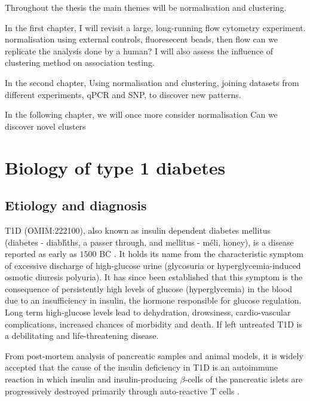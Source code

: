Throughout the thesis the main themes will be normalisation and clustering.

In the first chapter, I will revisit a large, long-running flow cytometry experiment.
normalisation using external controls, fluoresecent beads, then
flow can we replicate the analysis done by a human?
I will also assess the influence of clustering method on association testing.

In the second chapter,
Using normalisation and clustering, joining datasets from different experiments, qPCR and SNP, to discover new patterns.

In the following chapter,
we will once more consider normalisation 
Can we discover novel clusters



\section{Biology of type 1 diabetes}

\subsection{Etiology and diagnosis}

\Gls{T1D} (OMIM:222100), also known as insulin dependent diabetes mellitus (diabetes - \foreignlanguage{greek}{diab\'hths},
a passer through, and mellitus - \foreignlanguage{greek}{m\'eli}, honey), is a disease reported as early as $1500$ BC \citep{Poretsky:2010wr}.
It holds its name from the characteristic symptom of excessive discharge of high-glucose urine (glycosuria or hyperglycemia-induced osmotic diuresis polyuria).
It has since been established that this symptom is the consequence of persistently high levels of glucose (hyperglycemia) in the blood due to an insufficiency in insulin,
the hormone responsible for glucose regulation.
Long term high-glucose levels lead to dehydration, drowsiness, cardio-vascular complications, increased chances of morbidity and death.  
If left untreated T1D is a debilitating and life-threatening disease.

From post-mortem analysis of pancreatic samples and animal models,
it is widely accepted that the cause of the insulin deficiency in \gls{T1D} is an autoimmune reaction
in which insulin and insulin-producing $\beta$-cells of the pancreatic islets
are progressively destroyed primarily through auto-reactive T cells \citep{Todd:2010bl}.  

